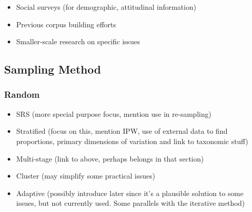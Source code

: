 \begin{itemize}
    \item Social surveys (for demographic, attitudinal information)
    \item Previous corpus building efforts
    \item Smaller-scale research on specific issues
\end{itemize}













\subsection{Sampling Method}





\subsubsection{Random}


\begin{itemize}
    \item SRS (more special purpose focus, mention use in re-sampling)
    \item Stratified (focus on this, mention IPW, use of external data to find proportions, primary dimensions of variation and link to taxonomic stuff)
    \item Multi-stage (link to above, perhaps belongs in that section)
    \item Cluster (may simplify some practical issues)
    \item Adaptive (possibly introduce later since it's a plausible solution to some issues, but not currently used.  Some parallels with the iterative method)
\end{itemize}

